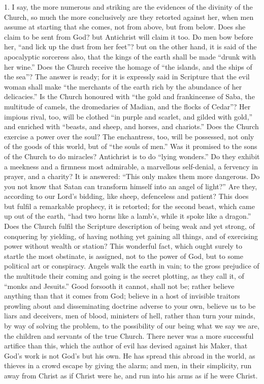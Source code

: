 1. I say, the more numerous and striking are the
evidences of the divinity of the Church, so much the more
conclusively are they retorted against her, when men
assume at starting that she comes, not from above, but
from below. Does she claim to be sent from God? but
Antichrist will claim it too. Do men bow before her,
``and lick up the dust from her feet''? but on
the other hand, it is said of the apocalyptic sorceress
also, that the kings of the earth shall be made
``drunk with her wine.'' Does the Church receive
the homage of ``the islands, and the ships of the
sea''? The answer is ready; for it is expressly said
in Scripture that the evil woman shall make ``the
merchants of the earth rich by the abundance of her
delicacies.'' Is the Church honoured with ``the
gold and frankincense of Saba, the multitude of camels, the dromedaries of Madian, and the flocks of Cedar''?
Her impious rival, too, will be clothed ``in purple
and scarlet, and gilded with gold,'' and enriched
with ``beasts, and sheep, and horses, and
chariots.'' Does the Church exercise a power over the
soul? The enchantress, too, will be possessed, not only
of the goods of this world, but of ``the souls of
men.'' Was it promised to the sons of the Church to
do miracles? Antichrist is to do ``lying
wonders.'' Do they exhibit a meekness and a firmness
most admirable, a marvellous self-denial, a fervency in
prayer, and a charity? It is answered: ``This only
makes them more dangerous. Do you not know that Satan can
transform himself into an angel of light?'' Are they,
according to our Lord's bidding, like sheep, defenceless
and patient? This does but fulfil a remarkable prophecy,
it is retorted; for the second beast, which came up out
of the earth, ``had two horns like a lamb's, while it
spoke like a dragon.'' Does the Church fulfil the
Scripture description of being weak and yet strong, of
conquering by yielding, of having nothing yet gaining all
things, and of exercising power without wealth or
station? This wonderful fact, which ought surely to
startle the most obstinate, is assigned, not to the power
of God, but to some political art or conspiracy. Angels
walk the earth in vain; to the gross prejudice of the
multitude their coming and going is the secret plotting,
as they call it, of ``monks and Jesuits.'' Good
forsooth it cannot, shall not be; rather believe anything
than that it comes from God; believe in a host of
invisible traitors prowling about and disseminating
doctrine adverse to your own, believe us to be liars and
deceivers, men of blood, ministers of hell, rather than
turn your minds, by way of solving the problem, to the
possibility of our being what we say we are, the children
and servants of the true Church. There never was a more
successful artifice than this, which the author of evil
has devised against his Maker, that God's work is not
God's but his own. He has spread this abroad in the
world, as thieves in a crowd escape by giving the alarm;
and men, in their simplicity, run away from Christ as if
Christ were he, and run into his arms as if he were
Christ.

